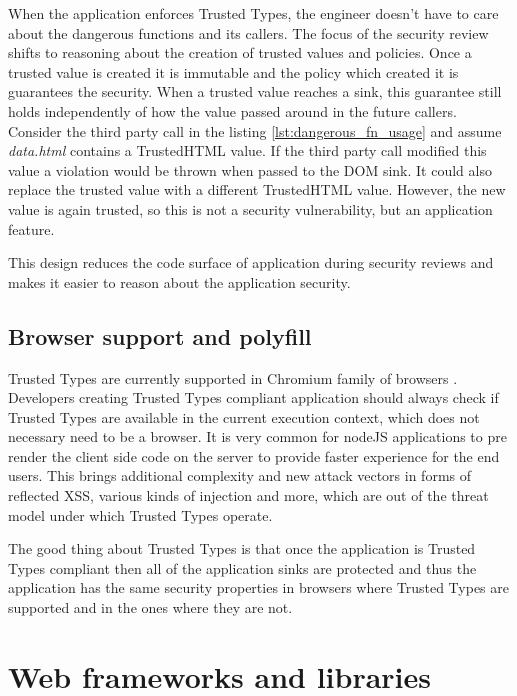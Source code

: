 When the application enforces Trusted Types, the engineer doesn't have to care about the dangerous
functions and its callers. The focus of the security review shifts to reasoning about the creation
of trusted values and policies. Once a trusted value is created it is immutable and the policy which
created it is guarantees the security. When a trusted value reaches a sink, this guarantee still
holds independently of how the value passed around in the future callers. Consider the third party
call in the listing \ref{lst:dangerous_fn_usage} and assume \textit{data.html} contains a
TrustedHTML value. If the third party call modified this value a violation would be thrown when
passed to the DOM sink. It could also replace the trusted value with a different TrustedHTML value.
However, the new value is again trusted, so this is not a security vulnerability, but an application
feature.

This design reduces the code surface of application during security reviews and makes it easier to
reason about the application security.

\subsection{Browser support and polyfill}

Trusted Types are currently supported in Chromium family of browsers \cite{mdn:tt_compatibility}.
Developers creating Trusted Types compliant application should always check if Trusted Types are
available in the current execution context, which does not necessary need to be a browser. It is
very common for nodeJS applications to pre render the client side code on the server to provide
faster experience for the end users. This brings additional complexity and new attack vectors in
forms of reflected XSS, various kinds of injection and more, which are out of the threat model under
which Trusted Types operate.

The good thing about Trusted Types is that once the application is Trusted Types compliant then all
of the application sinks are protected and thus the application has the same security properties in
browsers where Trusted Types are supported and in the ones where they are not.


\section{Web frameworks and libraries}

